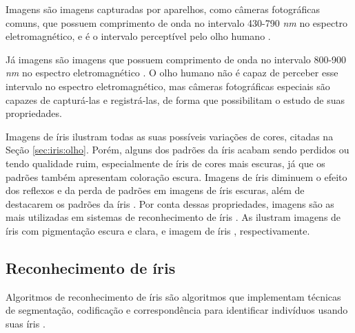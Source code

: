 Imagens \textit{} são imagens capturadas por aparelhos, como câmeras fotográficas comuns, que possuem comprimento de onda no intervalo 430-790 \textit{nm} no espectro eletromagnético, e é o intervalo perceptível pelo olho humano \cite{gonsalez2006}.

\par Já imagens  são imagens que possuem comprimento de onda no intervalo 800-900 \textit{nm} no espectro eletromagnético \cite{gonsalez2006}. O olho humano não é capaz de perceber esse intervalo no espectro eletromagnético, mas câmeras fotográficas especiais são capazes de capturá-las e registrá-las, de forma que possibilitam o estudo de suas propriedades\cite{nir}.


\par Imagens \textit{} de íris ilustram todas as suas possíveis variações de cores, citadas na Seção \ref{sec:iris:olho}. Porém, alguns dos padrões da íris acabam sendo perdidos ou tendo qualidade ruim, especialmente de íris de cores mais escuras, já que os padrões também apresentam coloração escura. Imagens de íris  diminuem o efeito dos reflexos e da perda de padrões em imagens de íris escuras, além de destacarem os padrões da íris \cite{abdullah2015}. Por conta dessas propriedades, imagens  são as mais utilizadas em sistemas de reconhecimento de íris \cite{daugman2004}. As  ilustram imagens de íris \textit{} com pigmentação escura e clara, e imagem de íris \textit{}, respectivamente.


%

\subsection{Reconhecimento de íris} \label{sec:iris:rec_iris}

\par Algoritmos de reconhecimento de íris são algoritmos que implementam técnicas de segmentação, codificação e correspondência para identificar indivíduos usando suas íris \cite{wayman2005biometric, daugman2004}.

